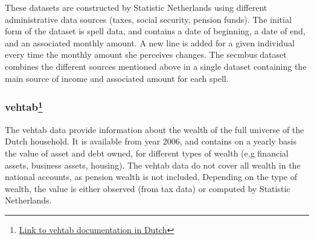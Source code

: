 \documentclass[12pt,a4paper]{article}
\begin{document}
These datasets are constructed by Statistic Netherlands using different administrative data sources (taxes, social security, pension funds). The initial form of the dataset is spell data, and contains a date of beginning, a date of end, and an associated monthly amount. A new line is added for a given individual every time the monthly amount she perceives changes. The secmbus dataset combines the different sources mentioned above in a single dataset containing the main source of income and associated amount for each spell. 

\subsubsection*{vehtab\footnote{\hyperlink{ https://www.cbs.nl/nl-nl/onze-diensten/maatwerk-en-microdata/microdata-zelf-onderzoek-doen/microdatabestanden/vehtab-vermogens-van-huishoudens
		}{Link to vehtab documentation in Dutch}}}

The vehtab data provide information about the wealth of the full universe of the Dutch household. It is available from year 2006, and contains on a yearly basis the value of asset and debt owned, for different types of wealth (e.g financial assets, business assets, housing). 
The vehtab data do not cover all wealth in the national accounts, as pension wealth is not included. 
Depending on the type of wealth, the value is either observed (from tax data) or computed by Statistic Netherlands. 
\end{document}
